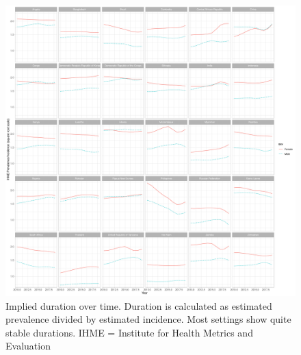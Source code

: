 \documentclass[12pt]{article}
\begin{document}
\begin{figure}
\centering
\includegraphics[width=1\textwidth]{../plots/aF6.pdf}
\caption[Implied duration over time]{Implied duration over time. Duration is
  calculated as estimated prevalence divided by estimated incidence. Most
  settings show quite stable durations. IHME = Institute for Health Metrics
  and Evaluation}
\end{figure}
\end{document}

